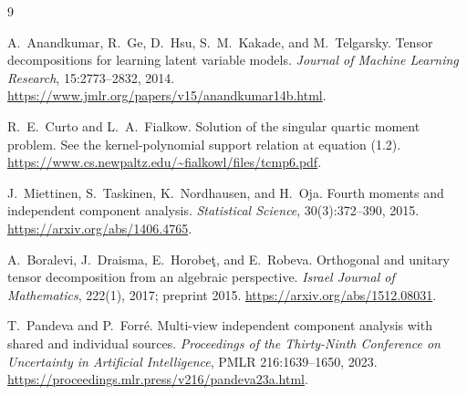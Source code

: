 \documentclass[11pt]{article}
\theoremstyle{definition}
\theoremstyle{remark}
\begin{document}
\begin{thebibliography}{9}

A.~Anandkumar, R.~Ge, D.~Hsu, S.~M.~Kakade, and M.~Telgarsky.
\newblock Tensor decompositions for learning latent variable models.
\newblock \emph{Journal of Machine Learning Research}, 15:2773--2832, 2014.
\newblock \url{https://www.jmlr.org/papers/v15/anandkumar14b.html}.

R.~E.~Curto and L.~A.~Fialkow.
\newblock Solution of the singular quartic moment problem.
\newblock See the kernel-polynomial support relation at equation (1.2).
\newblock \url{https://www.cs.newpaltz.edu/~fialkowl/files/tcmp6.pdf}.

J.~Miettinen, S.~Taskinen, K.~Nordhausen, and H.~Oja.
\newblock Fourth moments and independent component analysis.
\newblock \emph{Statistical Science}, 30(3):372--390, 2015.
\newblock \url{https://arxiv.org/abs/1406.4765}.

A.~Boralevi, J.~Draisma, E.~Horobe\c{t}, and E.~Robeva.
\newblock Orthogonal and unitary tensor decomposition from an algebraic
perspective.
\newblock \emph{Israel Journal of Mathematics}, 222(1), 2017;
preprint 2015.
\newblock \url{https://arxiv.org/abs/1512.08031}.

T.~Pandeva and P.~Forr\'e.
\newblock Multi-view independent component analysis with shared and
individual sources.
\newblock \emph{Proceedings of the Thirty-Ninth Conference on Uncertainty
in Artificial Intelligence}, PMLR 216:1639--1650, 2023.
\newblock \url{https://proceedings.mlr.press/v216/pandeva23a.html}.

\end{thebibliography}
\end{document}
